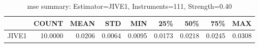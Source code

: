 \begin{table}[ht]
\centering
\caption{mse summary: Estimator=JIVE1, Instruments=111, Strength=0.40}
\begin{tabular}{lrrrrrrrr}
\toprule
 & COUNT & MEAN & STD & MIN & 25\% & 50\% & 75\% & MAX \\
\midrule
JIVE1 & 10.0000 & 0.0206 & 0.0064 & 0.0095 & 0.0173 & 0.0218 & 0.0245 & 0.0308 \\
\bottomrule
\end{tabular}
\end{table}
